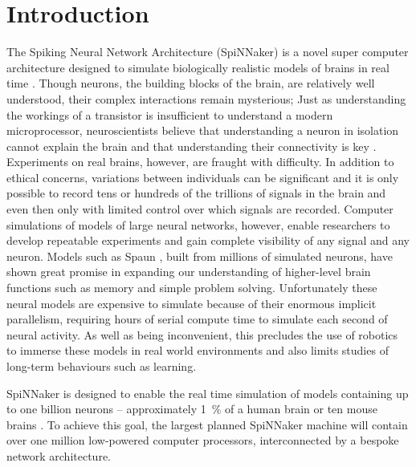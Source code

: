 \chapter{Introduction}

\label{sec:introduction}

%

The Spiking Neural Network Architecture (SpiNNaker) is a novel super computer
architecture designed to simulate biologically realistic models of brains in
real time \cite{furber07}. Though neurons, the building blocks of the brain,
are relatively well understood, their complex interactions remain mysterious;
Just as understanding the workings of a transistor is insufficient to
understand a modern microprocessor, neuroscientists believe that understanding
a neuron in isolation cannot explain the brain and that understanding their
connectivity is key \cite{eliasmith13,eliasmith14}. Experiments on real brains,
however, are fraught with difficulty. In addition to ethical concerns,
variations between individuals can be significant and it is only possible to
record tens or hundreds of the trillions of signals in the brain and even then
only with limited control over which signals are recorded. Computer simulations
of models of large neural networks, however, enable researchers to develop
repeatable experiments and gain complete visibility of any signal and any
neuron. Models such as Spaun \cite{eliasmith12}, built from millions of
simulated neurons, have shown great promise in expanding our understanding of
higher-level brain functions such as memory and simple problem solving.
Unfortunately these neural models are expensive to simulate because of their
enormous implicit parallelism, requiring hours of serial compute time to
simulate each second of neural activity. As well as being inconvenient, this
precludes the use of robotics to immerse these models in real world
environments and also limits studies of long-term behaviours such as learning.

SpiNNaker is designed to enable the real time simulation of models containing
up to one billion neurons -- approximately \SI{1}{\percent} of a human brain or
ten mouse brains \cite{furber06}. To achieve this goal, the largest planned
SpiNNaker machine will contain over one million low-powered computer
processors, interconnected by a bespoke network architecture.

